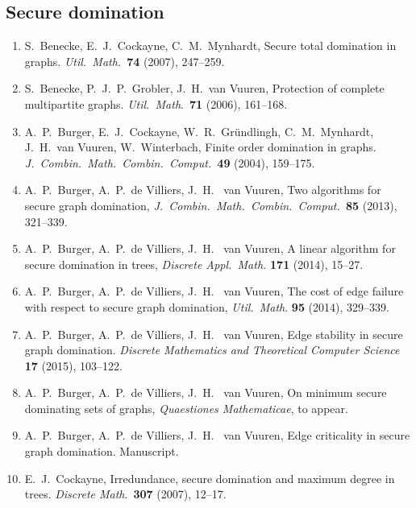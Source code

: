 \documentclass[12pt]{article}%
\begin{document}
\subsection*{Secure domination}

\begin{enumerate}
\item S.~Benecke, E.~J.~Cockayne, C.~M.~Mynhardt, Secure total domination in
graphs. \emph{Util.~Math.~}\textbf{74} (2007), 247--259.

\item S.~Benecke, P.~J.~P.~Grobler, J.~H.~van Vuuren, Protection of complete
multipartite graphs. \emph{Util.~Math}.~\textbf{71} (2006), 161--168.

\item A.~P.~Burger, E.~J.~Cockayne, W.~R.~Gr\"{u}ndlingh, C.~M.~Mynhardt,
J.~H.~van Vuuren, W.~Winterbach, Finite order domination in graphs.
\emph{J.~Combin.~Math.~Combin.~Comput.~}\textbf{49} (2004), 159--175.

\item A.~P.~Burger, A.~P.~de Villiers, J.~H.~ van Vuuren, Two algorithms for
secure graph domination, \emph{J.~Combin.~Math.~Combin.~Comput.~}\textbf{85}
(2013), 321--339.

\item A.~P.~Burger, A.~P.~de Villiers, J.~H.~ van Vuuren, A linear algorithm
for secure domination in trees, \emph{Discrete Appl.~Math.} \textbf{171}
(2014), 15--27.

\item A.~P.~Burger, A.~P.~de Villiers, J.~H.~ van Vuuren, The cost of edge
failure with respect to secure graph domination, \emph{Util.~Math}.
\textbf{95} (2014), 329--339.

\item A.~P.~Burger, A.~P.~de Villiers, J.~H.~ van Vuuren, Edge stability in
secure graph domination. \emph{Discrete Mathematics and Theoretical Computer
Science} \textbf{17 }(2015), 103--122.

\item A.~P.~Burger, A.~P.~de Villiers, J.~H.~ van Vuuren, On minimum secure
dominating sets of graphs, \emph{Quaestiones Mathematicae}, to appear.

\item A.~P.~Burger, A.~P.~de Villiers, J.~H.~ van Vuuren, Edge criticality in
secure graph domination. Manuscript.

\item E.~J.~Cockayne, Irredundance, secure domination and maximum degree in
trees. \emph{Discrete Math}.~\textbf{307 }(2007), 12--17.


\end{enumerate}
\end{document}
